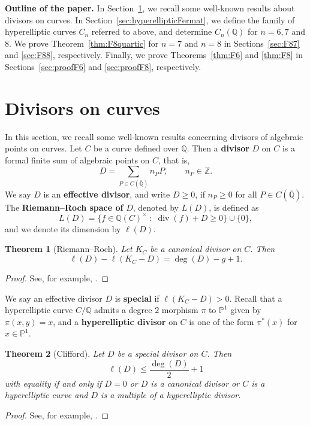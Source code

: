 \documentclass{amsart}
\newtheorem{thm}{Theorem}
\theoremstyle{definition}
\newcommand{\PP}{\mathbb{P}}
\newcommand{\Z}{\mathbb{Z}}
\newcommand{\Q}{\mathbb{Q}}
\DeclareMathOperator{\divv}{div}
\begin{document}
\textbf{Outline of the paper.} 
In Section~\ref{sec:divisors}, we recall some well-known results about divisors on curves. In Section~\ref{sec:hyperellipticFermat}, we define the family of hyperelliptic curves $C_n$ referred to above, and determine $C_n(\Q)$ for $n=6, 7$ and $8$. We prove Theorem~\ref{thm:F8quartic} for $n=7$ and $n=8$ in Sections~\ref{sec:F87} and \ref{sec:F88}, respectively. Finally, we prove Theorems~\ref{thm:F6} and \ref{thm:F8} in Sections~\ref{sec:proofF6} and \ref{sec:proofF8}, respectively. 

\section{Divisors on curves}\label{sec:divisors}

In this section, we recall some well-known results concerning divisors of algebraic points on curves. Let $C$ be a curve defined over $\Q$. 
Then a \textbf{divisor} $D$ on $C$ is a formal finite sum of algebraic points on $C$, that is,
\[
D = \sum_{P\in C(\bar{\Q})} n_{P}P,\qquad n_P\in\Z. 
\]
We say $D$ is an \textbf{effective divisor}, and write $D\geq 0$, if $n_P\geq 0$ for all $P\in C(\bar{\Q})$. The \textbf{Riemann--Roch space of} $D$, denoted by $L(D)$, is defined as
\[
L(D)=\{f\in \Q(C)^{\times}\; : \;\divv(f)+D\geq 0 \}\cup \{0\},
\]
and we denote its dimension by $\ell(D)$. 

\begin{thm}[Riemann--Roch]\label{thm:RR}
    Let $K_C$ be a canonical divisor on $C$.
    Then 
    \[
    \ell(D)-\ell(K_C-D) = \deg(D)-g+1.
    \]
\end{thm}
\begin{proof}
    See, for example, \cite{SilvermanAEC}.
\end{proof}
We say an effective divisor $D$ is \textbf{special} if $\ell(K_C-D)>0$. 
Recall that a hyperelliptic curve $C/\Q$ admits a degree $2$ morphism $\pi$ to $\PP^1$ given by $\pi(x,y)=x$, and a \textbf{hyperelliptic divisor} on $C$ is one of the form $\pi^{*}(x)$ for $x\in\PP^1$. 
\begin{thm}[Clifford]\label{thm:Clifford}
    Let $D$ be a special divisor on $C$.
    Then 
    \[
    \ell(D)\leq \frac{\deg(D)}{2} + 1
    \]
    with equality if and only if $D=0$ or $D$ is a canonical divisor or $C$ is a hyperelliptic curve and $D$ is a multiple of a hyperelliptic divisor. 
\end{thm}
\begin{proof}
    See, for example, \cite[Chapter III.1]{Hartshorne}.
\end{proof}
\end{document}

